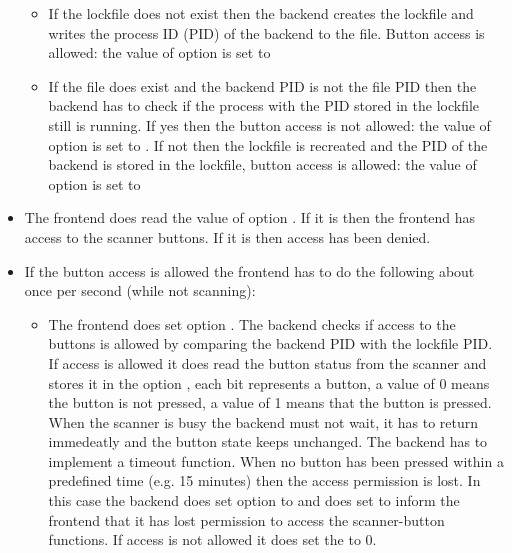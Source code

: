 \documentclass[11pt,DVIps]{report}
\begin{document}
\begin{changebar}
\begin{itemize}
  \begin{itemize}
  \item
  If the lockfile does not exist then the backend creates the lockfile and writes the
  process ID (PID) of the backend to the file. Button access is allowed: the value
  of option  is set to 
  \item
  If the file does exist and the backend PID is not the file PID then the
  backend has to check if the process with the PID stored in the lockfile
  still is running. If yes then the button access is not allowed: the value of
  option  is set to . If not then the lockfile
  is recreated and the PID of the backend is stored in the lockfile, button
  access is allowed: the value of option  is set to 
  \end{itemize}

\item
The frontend does read the value of option . If
it is  then the frontend has access to the scanner buttons.
If it is  then access has been denied.

\item
If the button access is allowed the frontend has to do the following about
once per second (while not scanning):
  \begin{itemize}
  \item
  The frontend does set option .
  The backend checks if access to the buttons is allowed by comparing
  the backend PID with the lockfile PID. If access is allowed it
  does read the button status from the scanner and stores it in
  the option , each bit represents a button, a
  value of 0 means the button is not pressed, a value of 1 means that the button
  is pressed. When the scanner is busy the backend must not wait, it has to
  return immedeatly and the button state keeps unchanged.
  The backend has to implement a timeout function. When no button has been pressed
  within a predefined time (e.g. 15 minutes) then the access permission is lost.
  In this case the backend does set option  to 
  and does set  to inform the frontend that it has
  lost permission to access the scanner-button functions.
  If access is not allowed it does set the  to 0.


\end{itemize}
\end{itemize}
\end{changebar}
\end{document}

